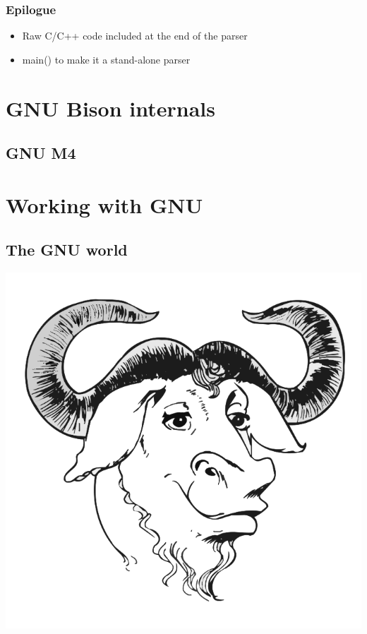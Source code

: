 \documentclass{beamer}
\begin{document}
\begin{frame}
  \frametitle{Epilogue}
    \begin{itemize}
      \item Raw C/C++ code included at the end of the parser
      \item main() to make it a stand-alone parser
    \end{itemize}
\end{frame}

\section{GNU Bison internals}

\subsection{GNU M4}

\begin{frame}
\end{frame}

\section{Working with GNU}

\subsection{The GNU world}

\begin{frame}
  \begin{center}
    \includegraphics[scale=0.3]{gnu}
  \end{center}
\end{frame}
\end{document}
